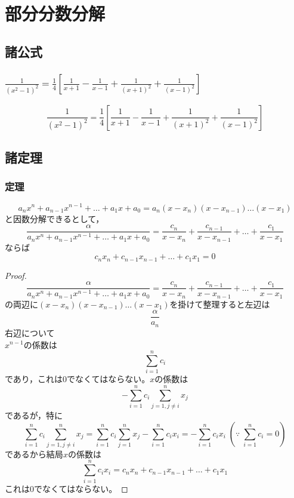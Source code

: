 \chapter{部分分数分解}
    \section{諸公式}
        \subsection{\texorpdfstring{$\frac{1}{(x^2-1)^2} = \frac{1}{4}\left[\frac{1}{x+1}-\frac{1}{x-1}+\frac{1}{(x+1)^2}+\frac{1}{(x-1)^2}\right]$}{1/(x\string^2-1)\string^2 = (1/4)[1/(x+1) - 1/(x-1) + 1/(x+1)\string^2 + 1/(x-1)\string^2]}}
            \label{sec:公式イ}
            \begin{shadebox}
                \[\frac{1}{(x^2-1)^2} = \frac{1}{4}\left[\frac{1}{x+1}-\frac{1}{x-1}+\frac{1}{(x+1)^2}+\frac{1}{(x-1)^2}\right]\]
            \end{shadebox}
    \section{諸定理}
        \subsection{定理\thesubsubsection}
            \begin{shadebox}
                \[a_nx^n+a_{n-1}x^{n-1}+\dots+a_1x+a_0 = a_n(x-x_n)(x-x_{n-1})\dots(x-x_1)\]
                と因数分解できるとして，
                \[\frac{\alpha}{a_nx^n+a_{n-1}x^{n-1}+\dots+a_1x+a_0} = \frac{c_n}{x-x_n}+\frac{c_{n-1}}{x-x_{n-1}}+\dots+\frac{c_1}{x-x_1}\]ならば
                \[c_nx_n+c_{n-1}x_{n-1}+\dots+c_1x_1 = 0\]
            \end{shadebox}
            \begin{proof}
                \[\frac{\alpha}{a_nx^n+a_{n-1}x^{n-1}+\dots+a_1x+a_0} = \frac{c_n}{x-x_n}+\frac{c_{n-1}}{x-x_{n-1}}+\dots+\frac{c_1}{x-x_1}\]
                の両辺に$(x-x_n)(x-x_{n-1})\dots(x-x_1)$を掛けて整理すると左辺は
                \[\frac{\alpha}{a_n}\]
                右辺について\\
                $x^{n-1}$の係数は
                \[\sum_{i=1}^{n}c_i\]
                であり，これは0でなくてはならない。$x$の係数は
                \[-\sum_{i=1}^{n}c_i\sum_{j=1,j\neq i}^{n}x_j\]であるが，特に
                \[\sum_{i=1}^{n}c_i\sum_{j=1,j\neq i}^{n}x_j = \sum_{i=1}^{n}c_i\sum_{j=1}^{n}x_j - \sum_{i=1}^{n}c_ix_i = -\sum_{i=1}^{n}c_ix_i\; \left(\because\; \sum_{i=1}^{n}c_i = 0\right)\]
                であるから結局$x$の係数は
                \[\sum_{i=1}^{n}c_ix_i = c_nx_n+c_{n-1}x_{n-1}+\dots+c_1x_1\]
                これは0でなくてはならない。
            \end{proof}